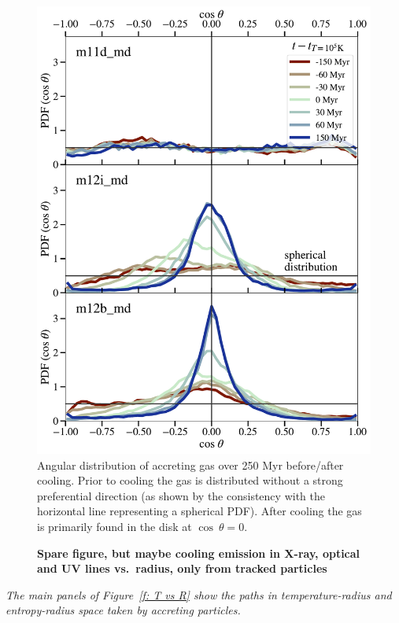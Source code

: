 \documentclass[fleqn,usenatbib]{mnras}
\begin{document}
\begin{figure}
    \centering
    \includegraphics[width=\columnwidth]{figures/theta_vs_t.pdf}
    \caption{
    Angular distribution of accreting gas over 250 Myr before/after cooling.
    Prior to cooling the gas is distributed without a strong preferential direction (as shown by the consistency with the horizontal line representing a spherical PDF).
    After cooling the gas is primarily found in the disk at $\cos\ \theta = 0$.
    }
    \label{f: theta vs R}
\end{figure}

\begin{figure}
    \centering
    \caption{
    \textbf{Spare figure, but maybe
    cooling emission in X-ray, optical and UV lines vs.\ radius, only from tracked particles
    }
    }
    \label{f:emission}
\end{figure}

\textit{
The main panels of Figure~\ref{f: T vs R} show the paths in temperature-radius and entropy-radius space taken by accreting particles.
}
\end{document}
